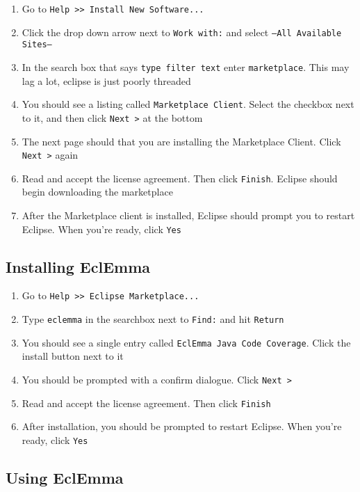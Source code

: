 \documentclass[11pt]{article}
\begin{document}
\begin{enumerate}
\item Go to \texttt{Help >> Install New Software...}
\item Click the drop down arrow next to \texttt{Work with:} and select
  \texttt{--All Available Sites--}
\item In the search box that says \texttt{type filter text} enter
  \texttt{marketplace}. This may lag a lot, eclipse is just poorly threaded
\item You should see a listing called \texttt{Marketplace Client}. Select the
  checkbox next to it, and then click \texttt{Next >} at the bottom
\item The next page should that you are installing the Marketplace
  Client. Click \texttt{Next >} again
\item Read and accept the license agreement. Then click \texttt{Finish}. Eclipse
  should begin downloading the marketplace
\item After the Marketplace client is installed, Eclipse should prompt you to
  restart Eclipse. When you're ready, click \texttt{Yes}
\end{enumerate}

\subsection{Installing EclEmma}\label{ssec:eclemma}

\begin{enumerate}
\item Go to \texttt{Help >> Eclipse Marketplace...}
\item Type \texttt{eclemma} in the searchbox next to \texttt{Find:} and hit
  \texttt{Return}
\item You should see a single entry called \texttt{EclEmma Java Code Coverage}.
  Click the install button next to it
\item You should be prompted with a confirm dialogue. Click \texttt{Next >}
\item Read and accept the license agreement. Then click \texttt{Finish}
\item After installation, you should be prompted to restart Eclipse. When
  you're ready, click \texttt{Yes}
\end{enumerate}

\subsection{Using EclEmma}
\end{document}
